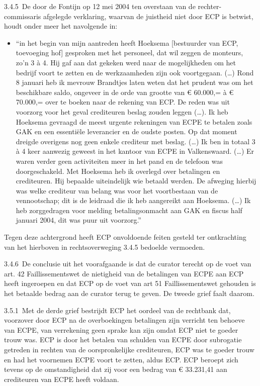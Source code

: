 \documentclass[
  dutch,
  a4paper,
]{article}
\providecommand{\tightlist}{%
  \setlength{\itemsep}{0pt}\setlength{\parskip}{0pt}}
\begin{document}
3.4.5 De door de Fontijn op 12 mei 2004 ten overstaan van de rechter-commissaris afgelegde verklaring, waarvan de juistheid niet door ECP is betwist, houdt onder meer het navolgende in:

\begin{itemize}
\tightlist
\item
  ``in het begin van mijn aantreden heeft Hoeksema {[}bestuurder van ECP, toevoeging hof{]} gesproken met het personeel, dat wil zeggen de monteurs, zo'n 3 à 4. Hij gaf aan dat gekeken werd naar de mogelijkheden om het bedrijf voort te zetten en de werkzaamheden zijn ook voortgegaan. (\ldots) Rond 8 januari heb ik mevrouw Brandtjes laten weten dat het prudent was om het beschikbare saldo, ongeveer in de orde van grootte van € 60.000,= à € 70.000,= over te boeken naar de rekening van ECP. De reden was uit voorzorg voor het geval crediteuren beslag zouden leggen (\ldots). Ik heb Hoeksema gevraagd de meest urgente rekeningen van ECPE te betalen zoals GAK en een essentiële leverancier en de oudste posten. Op dat moment dreigde overigens nog geen enkele crediteur met beslag. (\ldots) Ik ben in totaal 3 à 4 keer aanwezig geweest in het kantoor van ECPE in Valkenswaard. (\ldots) Er waren verder geen activiteiten meer in het pand en de telefoon was doorgeschakeld. Met Hoeksema heb ik overlegd over betalingen en crediteuren. Hij bepaalde uiteindelijk wie betaald werden. De afweging hierbij was welke crediteur van belang was voor het voortbestaan van de vennootschap; dit is de leidraad die ik heb aangereikt aan Hoeksema. (\ldots) Ik heb zorggedragen voor melding betalingsonmacht aan GAK en fiscus half januari 2004, dit was puur uit voorzorg.''
\end{itemize}

Tegen deze achtergrond heeft ECP onvoldoende feiten gesteld ter ontkrachting van het hierboven in rechtsoverweging 3.4.5 bedoelde vermoeden.

3.4.6 De conclusie uit het voorafgaande is dat de curator terecht op de voet van art. 42 Faillissementswet de nietigheid van de betalingen van ECPE aan ECP heeft ingeroepen en dat ECP op de voet van art 51 Faillissementswet gehouden is het betaalde bedrag aan de curator terug te geven. De tweede grief faalt daarom.

3.5.1 Met de derde grief bestrijdt ECP het oordeel van de rechtbank dat, voorzover door ECP na de overboekingen betalingen zijn verricht ten behoeve van ECPE, van verrekening geen sprake kan zijn omdat ECP niet te goeder trouw was. ECP is door het betalen van schulden van ECPE door subrogatie getreden in rechten van de oorspronkelijke crediteuren, ECP was te goeder trouw en had het voornemen ECPE voort te zetten, aldus ECP. ECP beroept zich tevens op de omstandigheid dat zij voor een bedrag van € 33.231,41 aan crediteuren van ECPE heeft voldaan.
\end{document}
